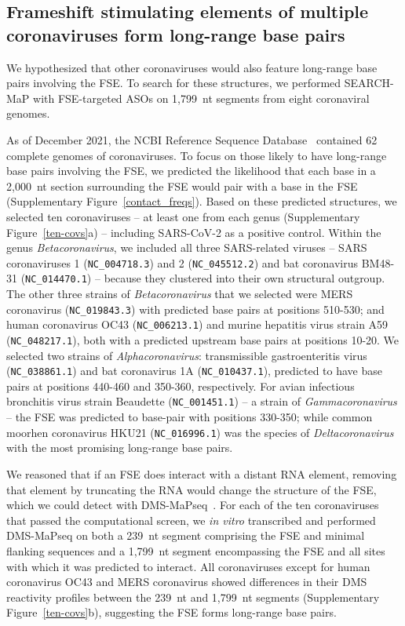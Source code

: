 \documentclass[main.tex]{subfiles}
\begin{document}
\subsection{Frameshift stimulating elements of multiple coronaviruses form long-range base pairs}

We hypothesized that other coronaviruses would also feature long-range base pairs involving the FSE.
To search for these structures, we performed SEARCH-MaP with FSE-targeted ASOs on 1,799~nt segments from eight coronaviral genomes.

As of December 2021, the NCBI Reference Sequence Database~\cite{OLeary2016} contained 62 complete genomes of coronaviruses.
To focus on those likely to have long-range base pairs involving the FSE, we predicted the likelihood that each base in a 2,000~nt section surrounding the FSE would pair with a base in the FSE (Supplementary Figure~\ref{contact_freqs}).
Based on these predicted structures, we selected ten coronaviruses -- at least one from each genus (Supplementary Figure~\ref{ten-covs}a) -- including SARS-CoV-2 as a positive control.
Within the genus \textit{Betacoronavirus}, we included all three SARS-related viruses -- SARS coronaviruses 1 (\verb|NC_004718.3|) and 2 (\verb|NC_045512.2|) and bat coronavirus BM48-31 (\verb|NC_014470.1|) -- because they clustered into their own structural outgroup.
The other three strains of \textit{Betacoronavirus} that we selected were MERS coronavirus (\verb|NC_019843.3|) with predicted base pairs at positions 510-530; and human coronavirus OC43 (\verb|NC_006213.1|) and murine hepatitis virus strain A59 (\verb|NC_048217.1|), both with a predicted upstream base pairs at positions 10-20.
We selected two strains of \textit{Alphacoronavirus}: transmissible gastroenteritis virus (\verb|NC_038861.1|) and bat coronavirus 1A (\verb|NC_010437.1|), predicted to have base pairs at positions 440-460 and 350-360, respectively.
For avian infectious bronchitis virus strain Beaudette (\verb|NC_001451.1|) -- a strain of \textit{Gammacoronavirus} -- the FSE was predicted to base-pair with positions 330-350; while common moorhen coronavirus HKU21 (\verb|NC_016996.1|) was the species of \textit{Deltacoronavirus} with the most promising long-range base pairs.

We reasoned that if an FSE does interact with a distant RNA element, removing that element by truncating the RNA would change the structure of the FSE, which we could detect with DMS-MaPseq~\cite{Zubradt2016}.
For each of the ten coronaviruses that passed the computational screen, we \textit{in vitro} transcribed and performed DMS-MaPseq on both a 239~nt segment comprising the FSE and minimal flanking sequences and a 1,799~nt segment encompassing the FSE and all sites with which it was predicted to interact.
All coronaviruses except for human coronavirus OC43 and MERS coronavirus showed differences in their DMS reactivity profiles between the 239~nt and 1,799~nt segments (Supplementary Figure~\ref{ten-covs}b), suggesting the FSE forms long-range base pairs.
\end{document}
